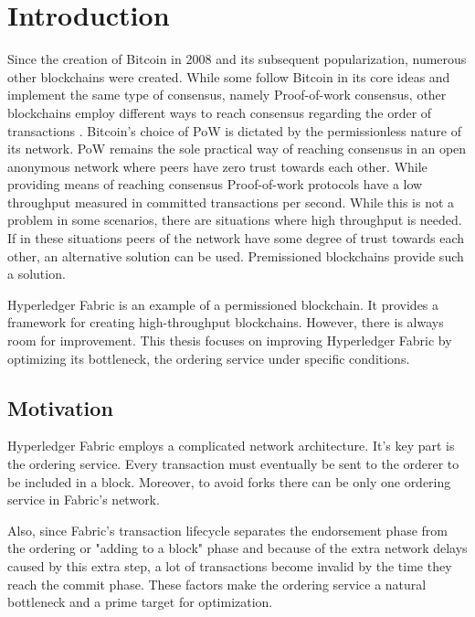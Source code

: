 \chapter{Introduction}
\label{chapter:introduction}

Since the creation of Bitcoin in 2008 \cite{lit:nakamoto} and its subsequent popularization, numerous other blockchains were created\cite{lit:litecoin, lit:dogecoin}. While some follow Bitcoin in its core ideas and implement the same type of consensus, namely Proof-of-work consensus, other blockchains employ different ways to reach consensus regarding the order of transactions \cite{lit:eth, lit:ethereum}. Bitcoin's choice of PoW is dictated by the permissionless nature of its network. PoW remains the sole practical way of reaching consensus in an open anonymous network where peers have zero trust towards each other. While providing means of reaching consensus Proof-of-work protocols have a low throughput measured in committed transactions per second. While this is not a problem in some scenarios, there are situations where high throughput is needed. If in these situations peers of the network have some degree of trust towards each other, an alternative solution can be used. Premissioned blockchains provide such a solution.

Hyperledger Fabric is an example of a permissioned blockchain\cite{lit:HF:ADOSPB}. It provides a framework for creating high-throughput blockchains. However, there is always room for improvement. This thesis focuses on improving Hyperledger Fabric by optimizing its bottleneck, the ordering service under specific conditions.

\section{Motivation}
\label{sec:motivation}

Hyperledger Fabric employs a complicated network architecture. It's key part is the ordering service. Every transaction must eventually be sent to the orderer to be included in a block. Moreover, to avoid forks there can be only one ordering service in Fabric's network.

Also, since Fabric's transaction lifecycle separates the endorsement phase from the ordering or "adding to a block" phase and because of the extra network delays caused by this extra step, a lot of transactions become invalid by the time they reach the commit phase. These factors make the ordering service a natural bottleneck and a prime target for optimization.

